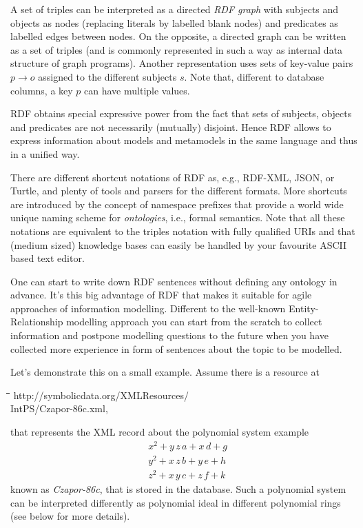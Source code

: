 \documentclass[a4paper,11pt]{article}
\newenvironment{code}{\par\small\tt\footnotesize \begin{tabbing}
\hskip12pt\=\hskip12pt\=\hskip12pt\=\hskip12pt\=\hskip5cm\=\hskip5cm\=\kill}
{\end{tabbing}\normalsize}
\begin{document}
\begin{multicols}{2}
A set of triples can be interpreted as a directed \emph{RDF graph} with
subjects and objects as nodes (replacing literals by labelled blank nodes) and
predicates as labelled edges between nodes. On the opposite, a directed graph
can be written as a set of triples (and is commonly represented in such a way
as internal data structure of graph programs). Another representation uses
sets of key-value pairs $p \to o$ assigned to the different subjects $s$.
Note that, different to database columns, a key $p$ can have multiple values.

RDF obtains special expressive power from the fact that sets of subjects,
objects and predicates are not necessarily (mutually) disjoint.  Hence RDF
allows to express information about models and metamodels in the same language
and thus in a unified way.

There are different shortcut notations of RDF as, e.g., \textsc{RDF-XML}, JSON,
or Turtle, and plenty of tools and parsers for the different formats.  More
shortcuts are introduced by the concept of namespace prefixes that provide a
world wide unique naming scheme for \emph{ontologies}, i.e., formal semantics.
Note that all these notations are equivalent to the triples notation with fully
qualified URIs and that (medium sized) knowledge bases can easily be handled by
your favourite ASCII based text editor.

One can start to write down RDF sentences without defining any ontology in
advance. It's this big advantage of RDF that makes it suitable for agile
approaches of information modelling. Different to the well-known
Entity-Relationship modelling approach you can start from the scratch to
collect information and postpone modelling questions to the future when you
have collected more experience in form of sentences about the topic to be
modelled.


Let's demonstrate this on a small example. Assume there is a resource at
\begin{code}
  http://symbolicdata.org/XMLResources/\\\> IntPS/Czapor-86c.xml,
\end{code}
that represents the XML record about the polynomial system example 
\begin{align*}
 &x^2+y\,z\,a+x\,d+g\\
 &y^2+x\,z\,b+y\,e+h\\
 &z^2+x\,y\,c+z\,f+k
\end{align*}
known as \emph{Czapor-86c}, that is stored in the {\SD} database.  Such a
polynomial system can be interpreted differently as polynomial ideal in
different polynomial rings (see below for more details).


\end{multicols}
\end{document}
